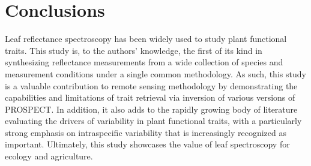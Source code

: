 \section{Conclusions}

Leaf reflectance spectroscopy has been widely used to study plant functional traits.
This study is, to the authors' knowledge, the first of its kind in synthesizing reflectance measurements from a wide collection of species and measurement conditions under a single common methodology.
As such, this study is a valuable contribution to remote sensing methodology by demonstrating the capabilities and limitations of trait retrieval via inversion of various versions of PROSPECT\@.
In addition, it also adds to the rapidly growing body of literature evaluating the drivers of variability in plant functional traits, with a particularly strong emphasis on intraspecific variability that is increasingly recognized as important.
Ultimately, this study showcases the value of leaf spectroscopy for ecology and agriculture.
% 
% 
